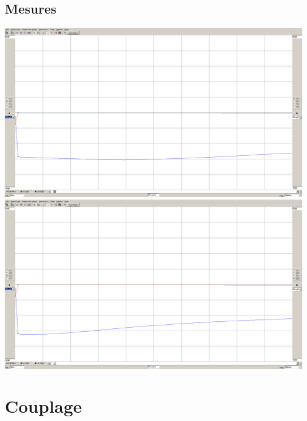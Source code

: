 \documentclass[a4paper,12pt]{report}            %
\begin{document}
\subsection{Mesures}
\begin{center}
	\includegraphics[scale = 0.25]{pic/S11_CDIO.png} \\
	\includegraphics[scale = 0.25]{pic/S22_CDIO.png}
\end{center}

\section{Couplage}
\end{document}
